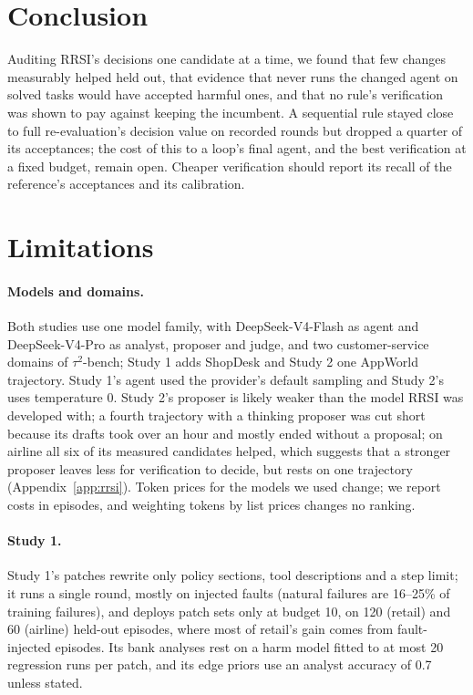 \documentclass[11pt]{article}
\begin{document}
\section{Conclusion}
Auditing RRSI's decisions one candidate at a time, we found that few changes measurably helped held out, that evidence that never runs the changed agent on solved tasks would have accepted harmful ones, and that no rule's verification was shown to pay against keeping the incumbent. A sequential rule stayed close to full re-evaluation's decision value on recorded rounds but dropped a quarter of its acceptances; the cost of this to a loop's final agent, and the best verification at a fixed budget, remain open. Cheaper verification should report its recall of the reference's acceptances and its calibration.

\section*{Limitations}
\paragraph{Models and domains.} Both studies use one model family, with DeepSeek-V4-Flash as agent and DeepSeek-V4-Pro as analyst, proposer and judge, and two customer-service domains of $\tau^2$-bench; Study 1 adds ShopDesk and Study 2 one AppWorld trajectory. Study 1's agent used the provider's default sampling and Study 2's uses temperature 0. Study 2's proposer is likely weaker than the model RRSI was developed with; a fourth trajectory with a thinking proposer was cut short because its drafts took over an hour and mostly ended without a proposal; on airline all six of its measured candidates helped, which suggests that a stronger proposer leaves less for verification to decide, but rests on one trajectory (Appendix~\ref{app:rrsi}). Token prices for the models we used change; we report costs in episodes, and weighting tokens by list prices changes no ranking.

\paragraph{Study 1.} Study 1's patches rewrite only policy sections, tool descriptions and a step limit; it runs a single round, mostly on injected faults (natural failures are 16--25\% of training failures), and deploys patch sets only at budget 10, on 120 (retail) and 60 (airline) held-out episodes, where most of retail's gain comes from fault-injected episodes. Its bank analyses rest on a harm model fitted to at most 20 regression runs per patch, and its edge priors use an analyst accuracy of 0.7 unless stated.
\end{document}
